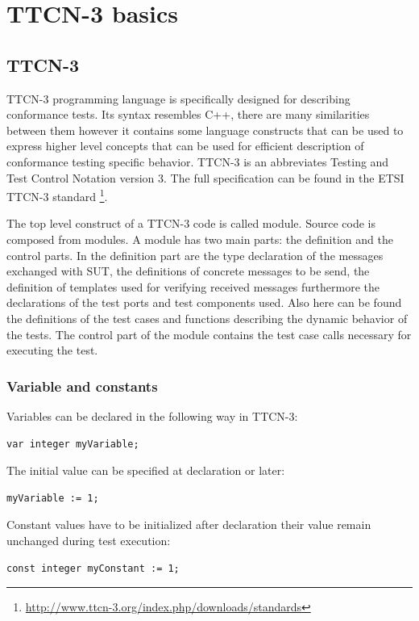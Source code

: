 \documentclass[a4paper]{article}
\begin{document}
\section{TTCN-3 basics}
\subsection{TTCN-3}
TTCN-3 programming language is specifically designed for describing conformance tests. Its syntax resembles C++, there
are many similarities between them however it contains some language constructs that can be used to express higher
level concepts that can be used for efficient description of conformance testing specific behavior. TTCN-3 is an
abbreviates Testing and Test Control Notation version 3. The full specification can be found in the ETSI TTCN-3
standard \cite{ttcn3}
\footnote{\url{http://www.ttcn-3.org/index.php/downloads/standards}}.

The top level construct of a TTCN-3 code is called module. Source code is composed from modules. A module has two main
parts: the definition and the control parts. In the definition part are the type declaration of the messages exchanged
with SUT, the definitions of concrete messages to be send, the definition of templates used for verifying received
messages furthermore the declarations of the test ports and test components used. Also here can be found the
definitions of the test cases and functions describing the dynamic behavior of the tests. The control part of the
module contains the test case calls necessary for executing the test.

\subsubsection{Variable and constants}

Variables can be declared in the following way in TTCN-3:

{\footnotesize
\begin{lstlisting}
var integer myVariable;
\end{lstlisting}
}

The initial value can be specified at declaration or later:
{\footnotesize
\begin{lstlisting}
myVariable := 1;
\end{lstlisting}
}

Constant values have to be initialized after declaration their value remain unchanged during test execution:

{\footnotesize
\begin{lstlisting}
const integer myConstant := 1;
\end{lstlisting}
}
\end{document}
